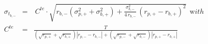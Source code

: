 


\begin{eqnarray*}
  \sigma_{t_{b,-}} & = & \ C^{te} \cdot \sqrt{r_{b,-}\left( \sigma_{p,+}^2 +
\sigma_{b,+}^2
          \right)  + \frac{\sigma_{b,-}^2} {4\,r_{b,-}}\,
          {\left( r_{p,+} - r_{b,+}\right) }^2} \ \ {\mathrm with}
\\
   C^{te} & = & \frac{T}
                 {\left( \sqrt{r_{p,+}} + \sqrt{r_{b,+}} \right)
                  \left| r_{p,-} - r_{b,-} \right| + 
                  \left( \sqrt{r_{p,-}} + \sqrt{r_{b,-}} \right)
                  \left| r_{p,+} - r_{b,+} \right|}
\end{eqnarray*}


